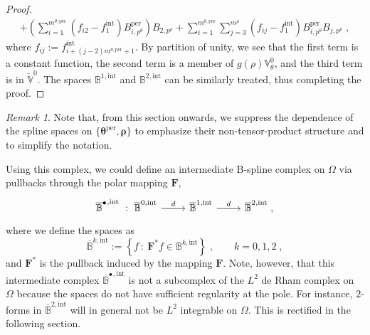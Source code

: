 \documentclass[10pt]{article}
\newcommand{\mbf}[1]{{\boldsymbol{#1}}}
\newcommand{\vSpace}[1]{\mathbb{#1}}
\newcommand{\complex}[1]{\mathit{\vSpace{#1}^\bullet}}
\newcommand{\cU}{\theta}
\newcommand{\cV}{\rho}
\newcommand{\degU}{p^\cU}
\newcommand{\degV}{p^\cV}
\newcommand{\kntU}{\cU}
\newcommand{\kntV}{\cV}
\newcommand{\kntsU}{\mbf{\kntU}}
\newcommand{\kntsV}{\mbf{\kntV}}
\newcommand{\pkntsU}{\kntsU^\per}
\newcommand{\ndofV}{m^\cV}
\newcommand{\bsp}{B}
\newcommand{\bspS}{\vSpace{\bsp}}
\newcommand{\per}{\mathrm{per}}
\newcommand{\pndofU}{m^{\cU,\per}}
\newcommand{\tint}{\mathrm{int}}
\newcommand{\polarDomain}{\Omega}
\theoremstyle{plain}
\theoremstyle{definition}
\theoremstyle{remark}
\newtheorem{remark}{Remark}[section]
\begin{document}
\begin{proof}
\begin{equation*}
\begin{split}
        + \left(\sum_{i=1}^{\pndofU}(f_{i2}-f_1^\tint)\bsp_{i,\degU}^{\per}\right)\bsp_{2,\degV}
        + \sum_{i=1}^{\pndofU}\sum_{j=3}^{\ndofV} (f_{ij}-f_1^\tint) \bsp^{\per}_{i,\degU} \bsp_{j,\degV}\;,
        \end{split}
    \end{equation*}
    where $f_{ij} := f^\tint_{i + (j-2)\pndofU + 1 }$.
    By partition of unity, we see that the first term is a constant function, the second term is a member of $g(\cV)\vSpace{V}_\cU^0$, and the third term is in $\check{\vSpace{V}}^0$.
    The spaces $\bspS^{1,\tint}$ and $\bspS^{2,\tint}$ can be similarly treated, thus completing the proof.
\end{proof}

\begin{remark}
    Note that, from this section onwards, we suppress the dependence of the spline spaces on $\{\pkntsU, \kntsV\}$ to emphasize their non-tensor-product structure and to simplify the notation.
\end{remark}

Using this complex, we could define an intermediate B-spline complex on $\polarDomain$ via pullbacks through the polar mapping $\mbf{F}$,
\begin{equation}
    \begin{tikzcd}
        \complex{\overline{\bsp}}^{,\tint}~:~ \overline{\bspS}^{0,\tint} \arrow{r}{d} & \overline{\bspS}^{1,\tint} \arrow{r}{d} & \overline{\bspS}^{2,\tint}\;,
    \end{tikzcd}
\end{equation}
where we define the spaces as
\begin{equation}\label{eq:intermediate-polar-spaces-physical}
    \overline{\bspS}^{k,\tint} := \left\{ f ~:~ \mbf{F}^* f  \in \bspS^{k,\tint} \right\}\;,\qquad k = 0, 1, 2\;,
\end{equation}
and $\mbf{F}^*$ is the pullback induced by the mapping $\mbf{F}$.
Note, however, that this intermediate complex $\complex{\overline{\bsp}}^{,\tint}$ is not a subcomplex of the $L^2$ de Rham complex on $\polarDomain$ because the spaces do not have sufficient regularity at the pole.
For instance, $2$-forms in $\overline{\bspS}^{2,\tint}$ will in general not be $L^2$ integrable on $\polarDomain$.
This is rectified in the following section.
\end{document}
